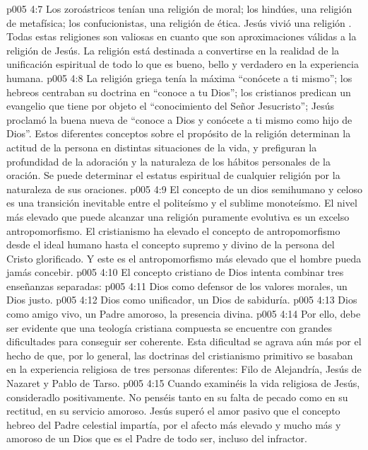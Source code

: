 \vs p005 4:7 Los zoroástricos tenían una religión de moral; los hindúes, una religión de metafísica; los confucionistas, una religión de ética. Jesús vivió una religión . Todas estas religiones son valiosas en cuanto que son aproximaciones válidas a la religión de Jesús. La religión está destinada a convertirse en la realidad de la unificación espiritual de todo lo que es bueno, bello y verdadero en la experiencia humana.
\vs p005 4:8 La religión griega tenía la máxima “conócete a ti mismo”; los hebreos centraban su doctrina en “conoce a tu Dios”; los cristianos predican un evangelio que tiene por objeto el “conocimiento del Señor Jesucristo”; Jesús proclamó la buena nueva de “conoce a Dios y conócete a ti mismo como hijo de Dios”. Estos diferentes conceptos sobre el propósito de la religión determinan la actitud de la persona en distintas situaciones de la vida, y prefiguran la profundidad de la adoración y la naturaleza de los hábitos personales de la oración. Se puede determinar el estatus espiritual de cualquier religión por la naturaleza de sus oraciones.
\vs p005 4:9 \pc El concepto de un dios semihumano y celoso es una transición inevitable entre el politeísmo y el sublime monoteísmo. El nivel más elevado que puede alcanzar una religión puramente evolutiva es un excelso antropomorfismo. El cristianismo ha elevado el concepto de antropomorfismo desde el ideal humano hasta el concepto supremo y divino de la persona del Cristo glorificado. Y este es el antropomorfismo más elevado que el hombre pueda jamás concebir.
\vs p005 4:10 \pc El concepto cristiano de Dios intenta combinar tres enseñanzas separadas:
\vs p005 4:11  Dios como defensor de los valores morales, un Dios justo.
\vs p005 4:12  Dios como unificador, un Dios de sabiduría.
\vs p005 4:13  Dios como amigo vivo, un Padre amoroso, la presencia divina.
\vs p005 4:14 \pc Por ello, debe ser evidente que una teología cristiana compuesta se encuentre con grandes dificultades para conseguir ser coherente. Esta dificultad se agrava aún más por el hecho de que, por lo general, las doctrinas del cristianismo primitivo se basaban en la experiencia religiosa de tres personas diferentes: Filo de Alejandría, Jesús de Nazaret y Pablo de Tarso.
\vs p005 4:15 \pc Cuando examinéis la vida religiosa de Jesús, consideradlo positivamente. No penséis tanto en su falta de pecado como en su rectitud, en su servicio amoroso. Jesús superó el amor pasivo que el concepto hebreo del Padre celestial impartía, por el afecto más elevado y mucho más  y amoroso de un Dios que es el Padre de todo ser, incluso del infractor.
